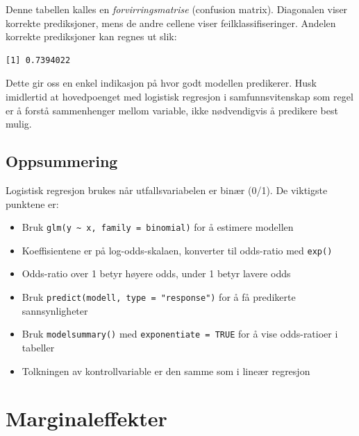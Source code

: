 \documentclass[
  norsk,
  letterpaper,
  DIV=11,
  numbers=noendperiod]{scrreprt}
\newenvironment{Shaded}{\begin{snugshade}}{\end{snugshade}}
\newcommand{\AttributeTok}[1]{\textcolor[rgb]{0.40,0.45,0.13}{#1}}
\newcommand{\ConstantTok}[1]{\textcolor[rgb]{0.56,0.35,0.01}{#1}}
\newcommand{\FunctionTok}[1]{\textcolor[rgb]{0.28,0.35,0.67}{#1}}
\newcommand{\NormalTok}[1]{\textcolor[rgb]{0.00,0.23,0.31}{#1}}
\newcommand{\SpecialCharTok}[1]{\textcolor[rgb]{0.37,0.37,0.37}{#1}}
\providecommand{\tightlist}{%
  \setlength{\itemsep}{0pt}\setlength{\parskip}{0pt}}
\theoremstyle{definition}
\theoremstyle{remark}
\begin{document}
Denne tabellen kalles en \emph{forvirringsmatrise} (confusion matrix).
Diagonalen viser korrekte prediksjoner, mens de andre cellene viser
feilklassifiseringer. Andelen korrekte prediksjoner kan regnes ut slik:

\begin{Shaded}
\end{Shaded}

\begin{verbatim}
[1] 0.7394022
\end{verbatim}

Dette gir oss en enkel indikasjon på hvor godt modellen predikerer. Husk
imidlertid at hovedpoenget med logistisk regresjon i samfunnsvitenskap
som regel er å forstå sammenhenger mellom variable, ikke nødvendigvis å
predikere best mulig.

\section{Oppsummering}\label{oppsummering-4}

Logistisk regresjon brukes når utfallsvariabelen er binær (0/1). De
viktigste punktene er:

\begin{itemize}
\tightlist
\item
  Bruk \texttt{glm(y\ \textasciitilde{}\ x,\ family\ =\ binomial)} for å
  estimere modellen
\item
  Koeffisientene er på log-odds-skalaen, konverter til odds-ratio med
  \texttt{exp()}
\item
  Odds-ratio over 1 betyr høyere odds, under 1 betyr lavere odds
\item
  Bruk \texttt{predict(modell,\ type\ =\ "response")} for å få
  predikerte sannsynligheter
\item
  Bruk \texttt{modelsummary()} med \texttt{exponentiate\ =\ TRUE} for å
  vise odds-ratioer i tabeller
\item
  Tolkningen av kontrollvariable er den samme som i lineær regresjon
\end{itemize}

\chapter{Marginaleffekter}\label{marginaleffekter}
\end{document}
